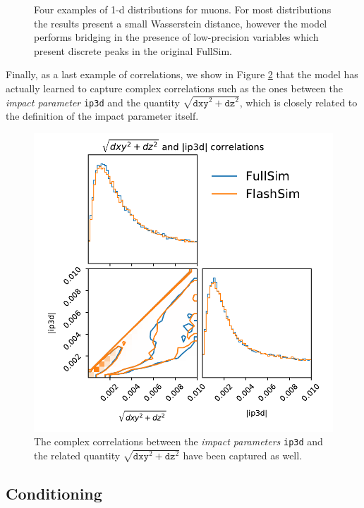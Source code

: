 \begin{figure}
    \caption[1-d muons distributions]{Four examples of 1-d distributions for muons. For most distributions the results present a small Wasserstein distance, however the model performs bridging in the presence of low-precision variables which present discrete peaks in the original FullSim.}\label{fig:muonsdists}
    
\end{figure}

Finally, as a last example of correlations, we show in Figure \ref{fig:corrmuons} that the model has actually learned to capture complex correlations such as the ones between the \emph{impact parameter} \texttt{ip3d} and the quantity $\sqrt{\texttt{dxy}^2 + \texttt{dz}^2}$, which is closely related to the definition of the impact parameter itself.

\begin{figure}
    \centering
    \includegraphics[scale=0.6]{gfx/ch5/mcorrs.pdf}
    \caption[Muons correlations]{The complex correlations between the \emph{impact parameters} \texttt{ip3d} and the related quantity $\sqrt{\texttt{dxy}^2 + \texttt{dz}^2}$ have been captured as well.}
    \label{fig:corrmuons}
\end{figure}


\subsection{Conditioning}

